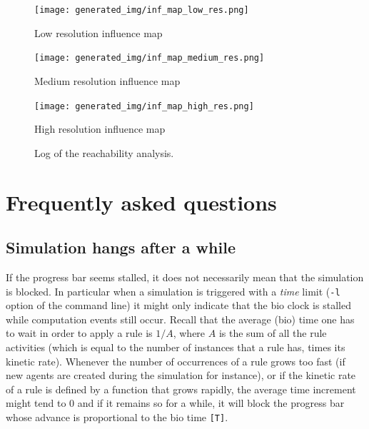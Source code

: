 \documentclass[11pt]{book}
\def\ttt#1{\texttt{#1}}
\begin{document}
\begin{figure}[htbp]
\begin{center}
\texttt{[image: generated\_img/inf\_map\_low\_res.png]}
\caption{Low resolution influence map}
\label{fig:low-res}
\end{center}
\end{figure}
\begin{figure}[htbp]
\begin{center}
\texttt{[image: generated\_img/inf\_map\_medium\_res.png]}
\caption{Medium resolution influence map}
\label{fig:medium-res}
\end{center}
\end{figure}
\begin{figure}[htbp]
\begin{center}
\texttt{[image: generated\_img/inf\_map\_high\_res.png]}
\caption{High resolution influence map}
\label{fig:high-res}
\end{center}
\end{figure}

\begin{figure}[t]

\caption{Log of the reachability analysis.}
\label{fig:reachability_influence}
\end{figure}

\chapter{Frequently asked questions}
\section*{Simulation hangs after a while}
If the progress bar seems stalled, it does not necessarily mean that the simulation is blocked. In particular when a simulation is triggered with a \emph{time} limit (\ttt{-l} option of the command line) it might only indicate that the bio clock is stalled while computation events still occur. Recall that the average (bio) time one has to wait in order to apply a rule is $1/A$, where $A$ is the sum of all the rule activities (which is equal to the number of instances that a rule has, times its kinetic rate). Whenever the number of occurrences of a rule grows too fast (if new agents are created during the simulation for instance), or if the kinetic rate of a rule is defined by a function that grows rapidly, the average time increment might tend to 0 and if it remains so for a while, it will block the progress bar whose advance is proportional to the bio time \ttt{[T]}.
\end{document}
